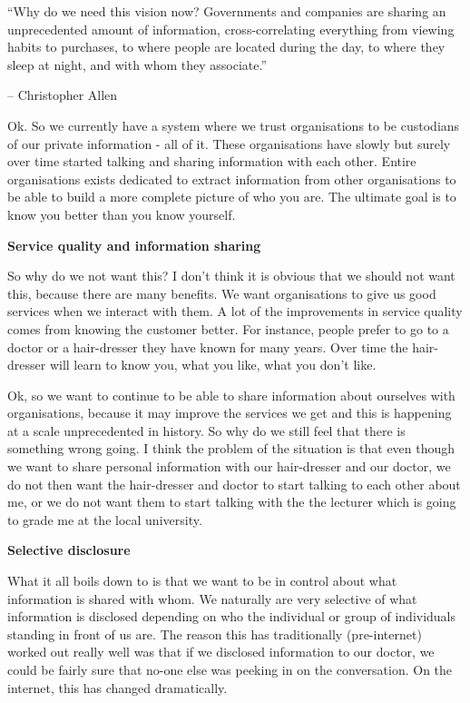 ``Why do we need this vision now? Governments and companies are sharing
an unprecedented amount of information, cross-correlating everything
from viewing habits to purchases, to where people are located during the
day, to where they sleep at night, and with whom they associate.''

-- Christopher Allen

Ok. So we currently have a system where we trust organisations to be
custodians of our private information - all of it. These organisations
have slowly but surely over time started talking and sharing information
with each other. Entire organisations exists dedicated to extract
information from other organisations to be able to build a more complete
picture of who you are. The ultimate goal is to know you better than you
know yourself.

\textbf{Service quality and information sharing}

So why do we not want this? I don't think it is obvious that we should
not want this, because there are many benefits. We want organisations to
give us good services when we interact with them. A lot of the
improvements in service quality comes from knowing the customer better.
For instance, people prefer to go to a doctor or a hair-dresser they
have known for many years. Over time the hair-dresser will learn to know
you, what you like, what you don't like.

Ok, so we want to continue to be able to share information about
ourselves with organisations, because it may improve the services we get
and this is happening at a scale unprecedented in history. So why do we
still feel that there is something wrong going. I think the problem of
the situation is that even though we want to share personal information
with our hair-dresser and our doctor, we do not then want the
hair-dresser and doctor to start talking to each other about me, or we
do not want them to start talking with the the lecturer which is going
to grade me at the local university.

\textbf{Selective disclosure}

What it all boils down to is that we want to be in control about what
information is shared with whom. We naturally are very selective of what
information is disclosed depending on who the individual or group of
individuals standing in front of us are. The reason this has
traditionally (pre-internet) worked out really well was that if we
disclosed information to our doctor, we could be fairly sure that no-one
else was peeking in on the conversation. On the internet, this has
changed dramatically.

